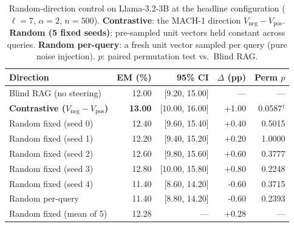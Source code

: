 \begin{table}[htbp]
\caption{Random-direction control on Llama-3.2-3B at the headline configuration ($\ell\!=\!7$, $\alpha\!=\!2$, $n\!=\!500$). \textbf{Contrastive}: the MACH-1 direction $V_{\text{neg}} - V_{\text{pos}}$. \textbf{Random (5 fixed seeds)}: pre-sampled unit vectors held constant across queries. \textbf{Random per-query}: a fresh unit vector sampled per query (pure noise injection). $p$: paired permutation test vs.\ Blind RAG.}
\label{tab:random-control}
\centering\renewcommand{\arraystretch}{1.15}
\begin{tabular}{l r r r r}
\toprule
Direction & EM (\%) & 95\% CI & $\Delta$ (pp) & Perm $p$ \\
\midrule
Blind RAG (no steering) & 12.00 & [9.20, 15.00] & --- & --- \\
\textbf{Contrastive ($V_{\text{neg}}-V_{\text{pos}}$)} & \textbf{13.00} & [10.00, 16.00] & +1.00 & 0.0587$^{\dagger}$ \\
Random fixed (seed 0) & 12.40 & [9.60, 15.40] & +0.40 & 0.5015 \\
Random fixed (seed 1) & 12.20 & [9.40, 15.20] & +0.20 & 1.0000 \\
Random fixed (seed 2) & 12.60 & [9.80, 15.60] & +0.60 & 0.3777 \\
Random fixed (seed 3) & 12.80 & [10.00, 15.80] & +0.80 & 0.2248 \\
Random fixed (seed 4) & 11.40 & [8.60, 14.20] & -0.60 & 0.3715 \\
Random per-query & 11.40 & [8.80, 14.20] & -0.60 & 0.2393 \\
\midrule
Random fixed (mean of 5) & 12.28 & --- & +0.28 & --- \\
\bottomrule\end{tabular}\end{table}
